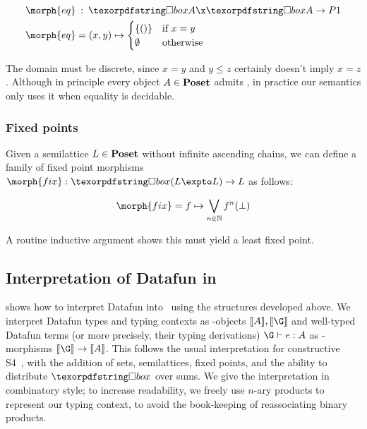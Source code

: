 \begin{align*}
  \morph{eq} &\isa \iso A \x \iso A \to \pfinof{\terminalobject}\\
  \morph{eq} &= (x,y) \mapsto 
  \begin{cases}
    \{()\} &\text{if }x = y\\
    \emptyset &\text{otherwise}
  \end{cases}
\end{align*}

\noindent
The domain must be discrete, since $x = y$ and $y \le z$ certainly doesn't imply $x = z$. Although in principle every object $A \in \textrm{\bfseries Poset}$ admits , in practice our semantics only uses it when equality is decidable.


\subsubsection{Fixed points}

Given a semilattice $L \in \textrm{\bfseries Poset}$ without infinite ascending chains, we can
define a family of fixed point morphisms $\morph{fix} : \iso (L \expto L) \to L$
as follows:

\begin{displaymath}
  \morph{fix} = f \mapsto \bigvee_{n \in \mathbb{N}} f^n(\bot)
\end{displaymath}

\noindent
A routine inductive argument shows this must yield a least fixed point.


\subsection{Interpretation of Datafun in \Poset}
\label{section-semantics}



 shows how to interpret Datafun into \Poset\ using the
structures developed above.
%
We interpret Datafun types and typing contexts as \Poset-objects $\den{A},
\den{\G}$ and well-typed Datafun terms (or more precisely, their typing
derivations) $\J e \G A$ as \Poset-morphisms $\den{\G} \to \den A$.
%
This follows the usual interpretation for constructive S4~\citep{depaiva-s4},
with the addition of sets, semilattices, fixed points, and the ability to
distribute $\iso$ over sums.
%
We give the interpretation in combinatory style; to increase readability, we
freely use $n$-ary products to represent our typing context, to avoid the
book-keeping of reassociating binary products.

